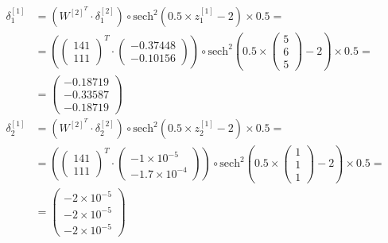 \documentclass[12pt]{article}
\begin{document}
\begin{enumerate}[leftmargin=\labelsep]
        \begingroup
        \allowdisplaybreaks
          \begin{align*}
            \delta^{[1]}_1 &= \left(W^{[2]^{T}} \cdot \delta^{[2]}_1\right) \circ \text{sech}^{2}\left(0.5 \times z^{[1]}_1 - 2\right) \times 0.5 = \\
             &= \left(\begin{pmatrix} 1 4 1 \\ 1 1 1 \end{pmatrix}^{T} \cdot \begin{pmatrix} -0.37448 \\ -0.10156 \end{pmatrix}\right) \circ \text{sech}^{2}\left(0.5 \times \begin{pmatrix}  5 \\ 6 \\ 5 \end{pmatrix} - 2\right) \times 0.5 = \\
             &= \begin{pmatrix} -0.18719 \\ -0.33587 \\ -0.18719\end{pmatrix} \\
            \delta^{[1]}_2 &= \left(W^{[2]^{T}} \cdot \delta^{[2]}_2\right) \circ  \text{sech}^{2}\left(0.5\times z^{[1]}_2 - 2\right) \times 0.5 = \\
             &= \left(\begin{pmatrix} 1 4 1 \\ 1 1 1 \end{pmatrix}^{T} \cdot \begin{pmatrix} -1 \times 10^{-5} \\ -1.7 \times 10^{-4} \end{pmatrix}\right) \circ \text{sech}^{2}\left(0.5\times\begin{pmatrix}  1 \\ 1 \\ 1 \end{pmatrix} - 2\right) \times 0.5 = \\
             &= \begin{pmatrix} -2 \times 10^{-5} \\ -2 \times 10^{-5} \\ -2 \times 10^{-5}\end{pmatrix}
          \end{align*}
        \endgroup


\end{enumerate}
\end{document}
